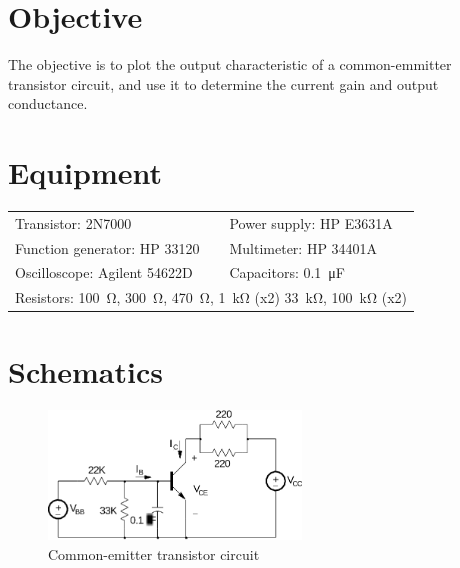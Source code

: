 

\section{Objective}
\label{sec:objective}

The objective is to plot the output characteristic of a common-emmitter transistor circuit, and use it to determine the current gain and output conductance.

\section{Equipment}
\label{sec:equipment}

\begin{tabular}{ll}
  \centering
  Transistor: 2N7000               & Power supply: HP E3631A            \\
  Function generator: HP 33120 & Multimeter: HP 34401A              \\
  Oscilloscope: Agilent 54622D & Capacitors: \SI{0.1}{\micro\farad} \\
  \multicolumn{2}{l}{Resistors: \SI{100}{\ohm}, \SI{300}{\ohm}, \SI{470}{\ohm}, \SI{1}{\kilo\ohm} (x2) \SI{33}{\kilo\ohm}, \SI{100}{\kilo\ohm} (x2)} \\
\end{tabular}

\section{Schematics}
\label{sec:schematics}

\begin{figure}[hbtp]
  \centering
  \includegraphics[width=0.6\textwidth]{circuit}
  \caption{\label{fig:circuit} Common-emitter transistor circuit}
\end{figure}

